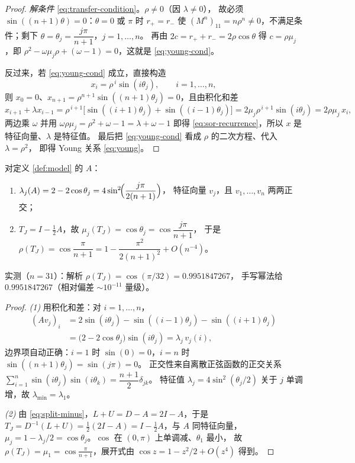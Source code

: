 \begin{proof}
\emph{解条件} \eqref{eq:transfer-condition}。$\rho\ne0$（因 $\lambda\ne0$），
故必须 $\sin((n+1)\theta)=0$：$\theta=0$ 或 $\pi$ 时 $r_+=r_-$ 使
$(M^n)_{11}=n\rho^n\ne0$，不满足条件；剩下 $\theta=\theta_j=\dfrac{j\pi}{n+1}$，$j=1,\dots,n$。
再由 $2c=r_++r_-=2\rho\cos\theta$ 得 $c=\rho\mu_j$，即
$\rho^2-\omega\mu_j\rho+(\omega-1)=0$，这就是 \eqref{eq:young-cond}。

反过来，若 \eqref{eq:young-cond} 成立，直接构造
\begin{equation}
  x_i=\rho^{\,i}\sin(i\theta_j),\qquad i=1,\dots,n,
  \label{eq:sor-eigvec}
\end{equation}
则 $x_0=0$、$x_{n+1}=\rho^{n+1}\sin((n+1)\theta_j)=0$，且由积化和差
\begin{equation}
  x_{i+1}+\lambda x_{i-1}
  =\rho^{\,i+1}\bigl[\sin((i+1)\theta_j)+\sin((i-1)\theta_j)\bigr]
  =2\mu_j\rho^{\,i+1}\sin(i\theta_j)=2\rho\mu_j\,x_i ,
\end{equation}
两边乘 $\omega$ 并用 $\omega\rho\mu_j=\rho^2+\omega-1=\lambda+\omega-1$ 即得
\eqref{eq:sor-recurrence}，所以 $x$ 是特征向量、$\lambda$ 是特征值。
最后把 \eqref{eq:young-cond} 看成 $\rho$ 的二次方程、代入 $\lambda=\rho^2$，
即得 Young 关系 \eqref{eq:young}。
\end{proof}

\begin{theorem}[模型问题的解析谱]
\label{thm:model-spectrum}
对定义 \ref{def:model} 的 $A$：
\begin{enumerate}
  \item $\lambda_j(A)=2-2\cos\theta_j=4\sin^2\!\Bigl(\dfrac{j\pi}{2(n+1)}\Bigr)$，
        特征向量 $v_j$，且 $v_1,\dots,v_n$ 两两正交；
  \item $T_J=I-\tfrac12A$，故 $\mu_j(T_J)=\cos\theta_j=\cos\dfrac{j\pi}{n+1}$，
        于是 $\rho(T_J)=\cos\dfrac{\pi}{n+1}=1-\dfrac{\pi^2}{2(n+1)^2}+O(n^{-4})$。
\end{enumerate}
实测（$n=31$）：解析 $\rho(T_J)=\cos(\pi/32)=0.9951847267$，
手写幂法给 $0.9951847267$（相对偏差 $\sim10^{-11}$ 量级）。
\end{theorem}

\begin{proof}
\emph{(1)} 用积化和差：对 $i=1,\dots,n$，
\begin{equation}
  \begin{split}
    (Av_j)_i&=2\sin(i\theta_j)-\sin((i-1)\theta_j)-\sin((i+1)\theta_j)\\
    &=\bigl(2-2\cos\theta_j\bigr)\sin(i\theta_j)=\lambda_j\,v_j(i),
  \end{split}
\end{equation}
边界项自动正确：$i=1$ 时 $\sin(0)=0$，$i=n$ 时 $\sin((n+1)\theta_j)=\sin(j\pi)=0$。
正交性来自离散正弦函数的正交关系
$\sum_{i=1}^n\sin(i\theta_j)\sin(i\theta_k)=\dfrac{n+1}{2}\delta_{jk}$。
特征值 $\lambda_j=4\sin^2(\theta_j/2)$ 关于 $j$ 单调增，故 $\lambda_{\min}=\lambda_1$。

\emph{(2)} 由 \eqref{eq:split-minus}，$L+U=D-A=2I-A$，于是
$T_J=D^{-1}(L+U)=\tfrac12(2I-A)=I-\tfrac12A$，与 $A$ 同特征向量，
$\mu_j=1-\lambda_j/2=\cos\theta_j$。$\cos$ 在 $(0,\pi)$ 上单调减、$\theta_1$ 最小，
故 $\rho(T_J)=\mu_1=\cos\frac{\pi}{n+1}$，展开式由 $\cos z=1-z^2/2+O(z^4)$ 得到。
\end{proof}

